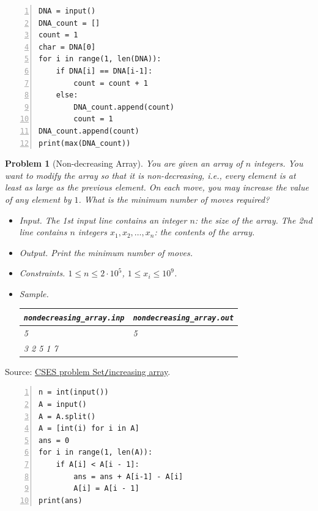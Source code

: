 \documentclass{article}
\newtheorem{problem}{Problem}
\begin{document}
\begin{Verbatim}[numbers=left,xleftmargin=5mm]
DNA = input()
DNA_count = []
count = 1
char = DNA[0]
for i in range(1, len(DNA)):
    if DNA[i] == DNA[i-1]:
        count = count + 1
    else:
        DNA_count.append(count)
        count = 1
DNA_count.append(count)
print(max(DNA_count))
\end{Verbatim}

\begin{problem}[Non-decreasing Array]
	You are given an array of $n$ integers. You want to modify the array so that it is non-decreasing, i.e., every element is at least as large as the previous element. On each move, you may increase the value of any element by $1$. What is the minimum number of moves required?
	\begin{itemize}
		\item {\sf Input.} The 1st input line contains an integer $n$: the size of the array. The 2nd line contains $n$ integers $x_1,x_2,\ldots,x_n$: the contents of the array.
		\item {\sf Output.} Print the minimum number of moves.
		\item {\sf Constraints.} $1\le n\le2\cdot10^5$, $1\le x_i\le10^9$.
		\item {\sf Sample.}
		\begin{table}[H]
			\centering
			\begin{tabular}{|l|l|}
				\hline
				\verb|nondecreasing_array.inp| & \verb|nondecreasing_array.out| \\
				\hline
				5 & 5 \\
				3 2 5 1 7 & \\
				\hline
			\end{tabular}
		\end{table}
	\end{itemize}
\end{problem}
Source: \href{https://cses.fi/problemset/task/1094}{CSES problem Set{\tt /}increasing array}.

\begin{Verbatim}[numbers=left,xleftmargin=5mm]
n = int(input())
A = input()
A = A.split()
A = [int(i) for i in A]
ans = 0
for i in range(1, len(A)):
    if A[i] < A[i - 1]:
        ans = ans + A[i-1] - A[i]
        A[i] = A[i - 1]
print(ans)
\end{Verbatim}
\end{document}
